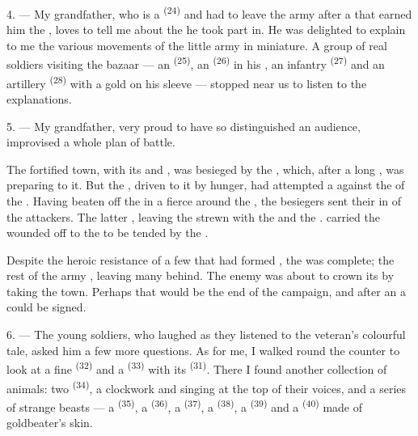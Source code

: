 \VUsaut{4.0mm}
\VUsaut{2.8mm}

4. --- My grandfather, who is a  \textsuperscript{(24)} and had
to leave the army after a  that earned him the
, loves to tell me about the  he
took part in. He was delighted to explain to me the various movements of
the little army in miniature. A group of real soldiers visiting the bazaar
--- an  \textsuperscript{(25)}, an 
\textsuperscript{(26)} in his , an infantry 
\textsuperscript{(27)} and an artillery  \textsuperscript{(28)} with a gold
 on his sleeve --- stopped near us to listen to the
explanations.

5. --- My grandfather, very proud to have so distinguished an audience,
improvised a whole plan of battle.

The fortified town, with its  and , was
besieged by the , which, after a long
, was preparing to  it. But the
, driven to it by hunger, had attempted a 
against the  of the . Having beaten off the
 in a fierce  around the , the
 besiegers sent their  in
 of the  attackers. The latter
, leaving the  strewn with the
 and the .  carried the
wounded off to the  to be tended by the
.

Despite the heroic resistance of a few  that had formed
, the  was complete; the rest of the army
, leaving many  behind. The enemy was about to
crown its  by taking the town. Perhaps that would be the end
of the campaign, and after an  a 
could be signed.

\VUsaut{4.4mm}
\VUsaut{2.8mm}

6. --- The young soldiers, who laughed as they listened to the veteran's
colourful tale, asked him a few more questions. As for me, I walked round
the counter to look at a fine  \textsuperscript{(32)} and a
 \textsuperscript{(33)} with its  \textsuperscript{(31)}. There I found
another collection of animals: two  \textsuperscript{(34)}, a
clockwork  and  singing at the top of
their voices, and a series of strange beasts --- a 
\textsuperscript{(35)}, a  \textsuperscript{(36)}, a  \textsuperscript{(37)}, a
 \textsuperscript{(38)}, a  \textsuperscript{(39)} and a 
\textsuperscript{(40)} made of goldbeater's skin.

